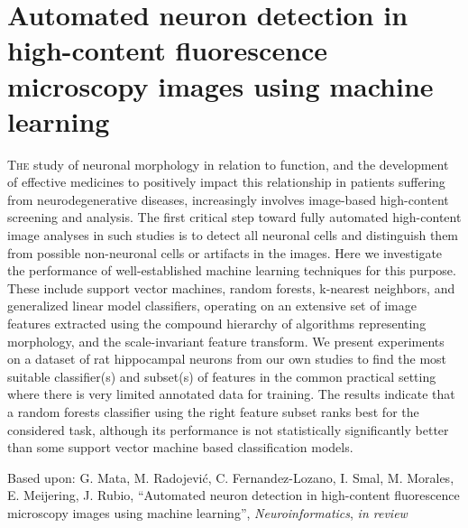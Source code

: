 %
%
\chpos{15mm}{8mm}
\chapter[Automated neuron detection in high-content fluorescence microscopy images using machine learning]{Automated neuron detection in high-content fluorescence microscopy images using machine learning}
\label{ch5:ndetchml}
{\small \lettrine{T}{he} study of neuronal morphology in relation to function, and the development of effective medicines to positively impact this relationship in patients suffering from neurodegenerative diseases, increasingly involves image-based high-content screening and analysis. The first critical step toward fully automated high-content image analyses in such studies is to detect all neuronal cells and distinguish them from possible non-neuronal cells or artifacts in the images. Here we investigate the performance of well-established machine learning techniques for this purpose. These include support vector machines, random forests, k-nearest neighbors, and generalized linear model classifiers, operating on an extensive set of image features extracted using the compound hierarchy of algorithms representing morphology, and the scale-invariant feature transform. We present experiments on a dataset of rat hippocampal neurons from our own studies to find the most suitable classifier(s) and subset(s) of features in the common practical setting where there is very limited annotated data for training. The results indicate that a random forests classifier using the right feature subset ranks best for the considered task, although its performance is not statistically significantly better than some support vector machine based classification models.\par}
\vspace*{12em}
\begin{publish}
	Based upon: G. Mata, M. Radojevi\'{c}, C. Fernandez-Lozano, I. Smal, M. Morales, E. Meijering, J. Rubio, ``Automated neuron detection in high-content fluorescence microscopy images using machine learning'', \textit{Neuroinformatics}, \textit{in review}
\end{publish}%

